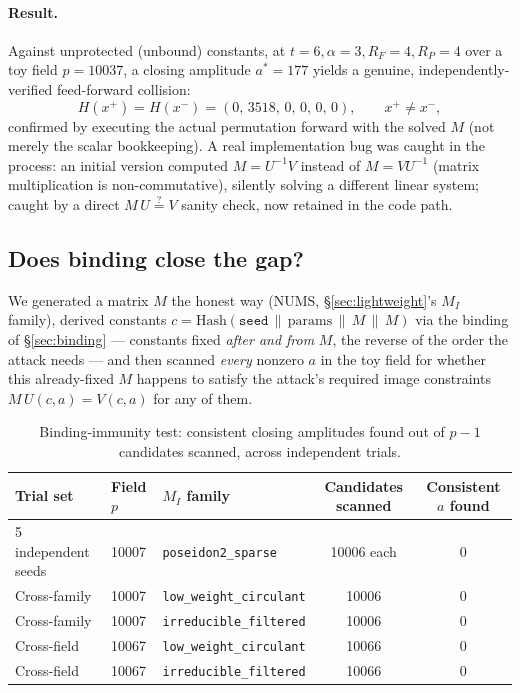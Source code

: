 \documentclass[11pt]{article}
\newcommand{\MI}{M_{I}}
\begin{document}
\paragraph{Result.} Against unprotected (unbound) constants, at
$t=6,\alpha=3,R_F=4,R_P=4$ over a toy field $p=10037$, a closing amplitude
$a^{*}=177$ yields a genuine, independently-verified feed-forward
collision:
\[
  H(x^+) = H(x^-) = (0,\,3518,\,0,\,0,\,0,\,0), \qquad x^+ \neq x^-,
\]
confirmed by executing the actual permutation forward with the solved $M$
(not merely the scalar bookkeeping). A real implementation bug was caught
in the process: an initial version computed $M = U^{-1}V$ instead of
$M=VU^{-1}$ (matrix multiplication is non-commutative), silently solving
a different linear system; caught by a direct $M\,U \stackrel{?}{=} V$
sanity check, now retained in the code path.

\subsection{Does binding close the gap?}

We generated a matrix $M$ the honest way (NUMS,
\S\ref{sec:lightweight}'s $\MI$ family), derived constants
$c = \mathrm{Hash}(\mathtt{seed}\,\|\,\mathrm{params}\,\|\,M\,\|\,M)$ via
the binding of \S\ref{sec:binding} --- constants fixed \emph{after and
from} $M$, the reverse of the order the attack needs --- and then scanned
\emph{every} nonzero $a$ in the toy field for whether this already-fixed
$M$ happens to satisfy the attack's required image constraints
$M\,U(c,a) = V(c,a)$ for any of them.

\begin{table}[h!]
\centering
\caption{Binding-immunity test: consistent closing amplitudes found out
of $p-1$ candidates scanned, across independent trials.}
\label{tab:immunity}
\begin{tabular}{@{}lllcc@{}}
\toprule
Trial set & Field $p$ & $\MI$ family & Candidates scanned & Consistent $a$ found \\
\midrule
5 independent seeds & 10007 & \texttt{poseidon2\_sparse} & 10006 each & 0 \\
Cross-family & 10007 & \texttt{low\_weight\_circulant} & 10006 & 0 \\
Cross-family & 10007 & \texttt{irreducible\_filtered} & 10006 & 0 \\
Cross-field & 10067 & \texttt{low\_weight\_circulant} & 10066 & 0 \\
Cross-field & 10067 & \texttt{irreducible\_filtered} & 10066 & 0 \\
\bottomrule
\end{tabular}
\end{table}
\end{document}
